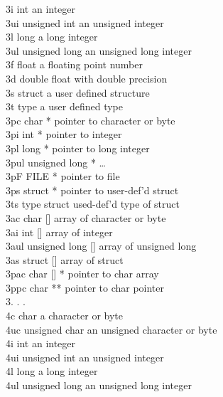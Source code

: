 \documentclass[12pt]{article}
\begin{document}
\begin{mylist}
3i        int                     an integer\\
3ui       unsigned int            an unsigned integer\\
3l        long                    a long integer\\
3ul       unsigned long           an unsigned long integer\\
3f        float                   a floating point number\\
3d        double          float with double precision\\
3s        struct          a user defined structure\\
3t        type                    a user defined type\\
3pc       char *          pointer to character or byte\\
3pi       int *                   pointer to integer\\
3pl       long *          pointer to long integer\\
3pul      unsigned long *         \dots\\
3pF       FILE *          pointer to file\\
3ps       struct *                pointer to user-def'd struct\\
3ts       type struct             used-def'd type of struct\\
3ac       char []                 array of character or byte\\
3ai       int []          array of integer\\
3aul      unsigned long []        array of unsigned long\\
3as       struct []               array of struct\\
3pac      char [] *               pointer to char array\\
3ppc      char **                 pointer to char pointer\\
3.          .                     . \\
4c        char                    a character or byte\\
4uc       unsigned char           an unsigned character or byte\\
4i        int                     an integer\\
4ui       unsigned int            an unsigned integer\\
4l        long                    a long integer\\
4ul       unsigned long           an unsigned long integer\\

\end{mylist}
\end{document}
